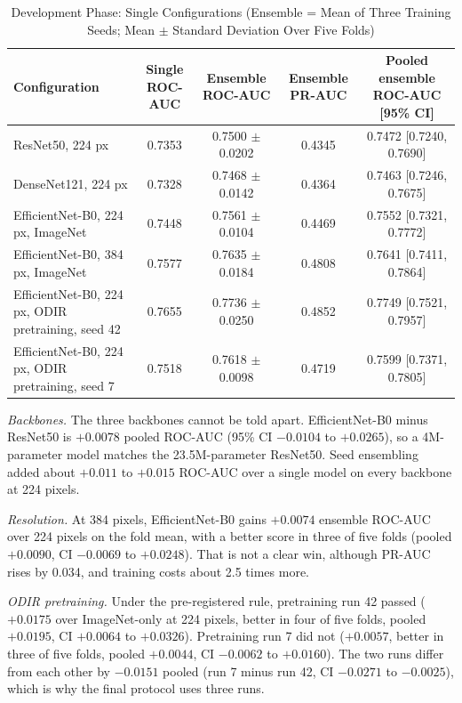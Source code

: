 \begin{table}[!t]
\caption{Development Phase: Single Configurations (Ensemble = Mean of Three Training Seeds; Mean $\pm$ Standard Deviation Over Five Folds)}
\label{tab:single}
\centering
\footnotesize
\begin{tabular}{lcccc}
\toprule
Configuration & Single ROC-AUC & Ensemble ROC-AUC & Ensemble PR-AUC & Pooled ensemble ROC-AUC [95\% CI] \\
\midrule
ResNet50, 224 px & 0.7353 & 0.7500 $\pm$ 0.0202 & 0.4345 & 0.7472 [0.7240, 0.7690] \\
DenseNet121, 224 px & 0.7328 & 0.7468 $\pm$ 0.0142 & 0.4364 & 0.7463 [0.7246, 0.7675] \\
EfficientNet-B0, 224 px, ImageNet & 0.7448 & 0.7561 $\pm$ 0.0104 & 0.4469 & 0.7552 [0.7321, 0.7772] \\
EfficientNet-B0, 384 px, ImageNet & 0.7577 & 0.7635 $\pm$ 0.0184 & 0.4808 & 0.7641 [0.7411, 0.7864] \\
EfficientNet-B0, 224 px, ODIR pretraining, seed 42 & 0.7655 & 0.7736 $\pm$ 0.0250 & 0.4852 & 0.7749 [0.7521, 0.7957] \\
EfficientNet-B0, 224 px, ODIR pretraining, seed 7 & 0.7518 & 0.7618 $\pm$ 0.0098 & 0.4719 & 0.7599 [0.7371, 0.7805] \\
\bottomrule
\end{tabular}
\end{table}

\textit{Backbones.} The three backbones cannot be told apart. EfficientNet-B0 minus ResNet50 is $+0.0078$ pooled ROC-AUC (95\% CI $-0.0104$ to $+0.0265$), so a 4M-parameter model matches the 23.5M-parameter ResNet50. Seed ensembling added about $+0.011$ to $+0.015$ ROC-AUC over a single model on every backbone at 224 pixels.

\textit{Resolution.} At 384 pixels, EfficientNet-B0 gains $+0.0074$ ensemble ROC-AUC over 224 pixels on the fold mean, with a better score in three of five folds (pooled $+0.0090$, CI $-0.0069$ to $+0.0248$). That is not a clear win, although PR-AUC rises by 0.034, and training costs about 2.5 times more.

\textit{ODIR pretraining.} Under the pre-registered rule, pretraining run 42 passed ($+0.0175$ over ImageNet-only at 224 pixels, better in four of five folds, pooled $+0.0195$, CI $+0.0064$ to $+0.0326$). Pretraining run 7 did not ($+0.0057$, better in three of five folds, pooled $+0.0044$, CI $-0.0062$ to $+0.0160$). The two runs differ from each other by $-0.0151$ pooled (run 7 minus run 42, CI $-0.0271$ to $-0.0025$), which is why the final protocol uses three runs.


